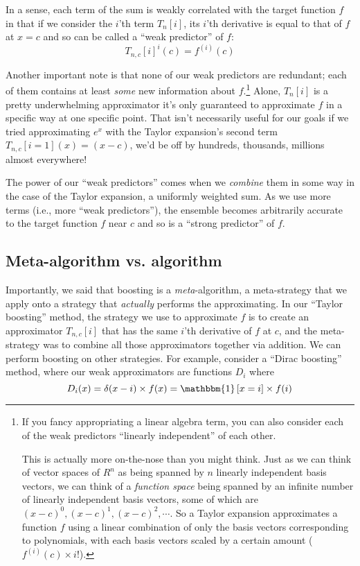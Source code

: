 \documentclass[letterpaper,12pt]{report}
\begin{document}
In a sense, each term of the sum is weakly correlated with the target function $f$ in that
if we consider the \(i\)'th term \(T_n[i]\), its \(i\)'th derivative is equal to 
that of \(f\) at \(x = c\) and so can be called a ``weak predictor'' of \(f\):
\[T_{n,c}[i]^{{i}}(c) = f^{(i)}(c) \]

Another important note is that none of our weak predictors are redundant; each of them
contains at least \emph{some} new information about \(f\).\footnote{
  If you fancy appropriating a linear algebra term, you can also consider each of the weak
  predictors ``linearly independent'' of each other. 

  This is actually more on-the-nose than
  you might think. Just as we can think of vector spaces of \(R^n\) as being spanned by
  \(n\) linearly independent basis vectors, we can think of a 
  \emph{function space} being
  spanned by an infinite number of linearly independent basis vectors, some of which
  are \((x-c)^0, (x-c)^1, (x-c)^2, \cdots\). 
  So a Taylor expansion approximates a function \(f\) using a linear combination of
  only the basis vectors corresponding to polynomials, with each basis vectors scaled 
  by a certain amount (\(f^{(i)}(c) \times {i!}\)).
}
Alone, \(T_n[i]\) is a pretty underwhelming approximator \textendash{} it's only guaranteed to
approximate \(f\) in a specific way at one specific point. 
That isn't necessarily useful for our goals \textemdash{}
if we tried approximating \(e^x\) with the Taylor expansion's second term
\(T_{n,c}[i = 1](x) = (x - c)\), we'd be off by hundreds, thousands, millions almost everywhere!

The power of our ``weak predictors'' comes when we \emph{combine} them in some way 
\textemdash{} in the case of the Taylor expansion, a uniformly weighted sum. 
As we use more terms (i.e., more ``weak predictors''),
the ensemble becomes arbitrarily accurate to the target function \(f\) near \(c\) and so is
a ``strong predictor'' of \(f\).



\subsection{Meta-algorithm vs. algorithm}\label{meta-algorithm-vs-algorithm}

Importantly, we said that boosting is a \emph{meta}-algorithm, a meta-strategy that we
apply onto a strategy that \emph{actually} performs the approximating. 
In our ``Taylor boosting'' method, the strategy we use to approximate \(f\) is to create an
approximator \(T_{n,c}[i]\) that has the same \(i\)'th derivative of \(f\) at \(c\), and the
meta-strategy was to combine all those approximators together via addition. We can perform
boosting on other strategies. For example, consider a ``Dirac boosting'' method, where our
weak approximators are functions \(D_i\) where
\[D_i(x) = \delta(x-i) \times f(x) = \mathbbm{1}\left[x = i\right] \times f(i) \]
\end{document}
